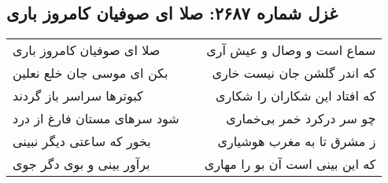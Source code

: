 \begin{center}
\section*{غزل شماره ۲۶۸۷: صلا ای صوفیان کامروز باری}
\label{sec:2687}
\begin{longtable}{l p{0.5cm} r}
صلا ای صوفیان کامروز باری
&&
سماع است و وصال و عیش آری
\\
بکن ای موسی جان خلع نعلین
&&
که اندر گلشن جان نیست خاری
\\
کبوترها سراسر باز گردند
&&
که افتاد این شکاران را شکاری
\\
شود سرهای مستان فارغ از درد
&&
چو سر درکرد خمر بی‌خماری
\\
بخور که ساعتی دیگر نبینی
&&
ز مشرق تا به مغرب هوشیاری
\\
برآور بینی و بوی دگر جوی
&&
که این بینی است آن بو را مهاری
\\
\end{longtable}
\end{center}
